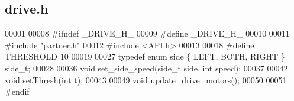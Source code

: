 \subsection{drive.\+h}
\label{drive_8h_source}

\begin{DoxyCode}
00001 
00008 \textcolor{preprocessor}{#ifndef \_DRIVE\_H\_}
00009 \textcolor{preprocessor}{#define \_DRIVE\_H\_}
00010 
00011 \textcolor{preprocessor}{#include "partner.h"}
00012 \textcolor{preprocessor}{#include <API.h>}
00013 
00018 \textcolor{preprocessor}{#define THRESHOLD 10}
00019 
00027 \textcolor{keyword}{typedef} \textcolor{keyword}{enum} side \{ LEFT, BOTH, RIGHT \} side_t;
00028 
00036 \textcolor{keywordtype}{void} set_side_speed(side_t side, \textcolor{keywordtype}{int} speed);
00037 
00042 \textcolor{keywordtype}{void} setThresh(\textcolor{keywordtype}{int} t);
00043 
00049 \textcolor{keywordtype}{void} update_drive_motors();
00050 
00051 \textcolor{preprocessor}{#endif}
\end{DoxyCode}
